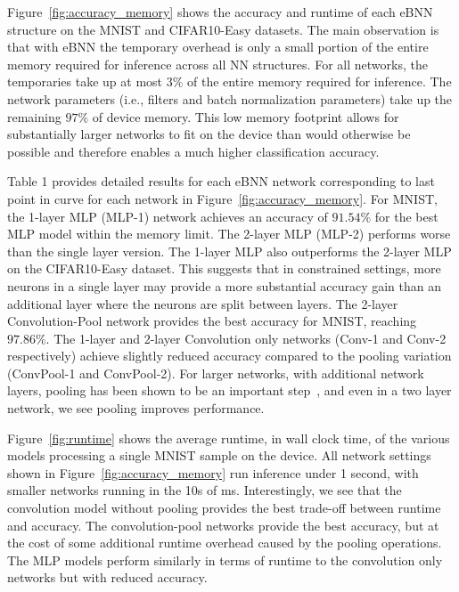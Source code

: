\documentclass[10pt,emptycopyrightspace]{ewsn-proc}
\begin{document}
Figure~\ref{fig:accuracy_memory} shows the accuracy and runtime of each eBNN structure on the MNIST and CIFAR10-Easy datasets. The main observation is that with eBNN the temporary overhead is only a small portion of the entire memory required for inference across all NN structures. For all networks, the temporaries take up at most $3\%$ of the entire memory required for inference. The network parameters (i.e., filters and batch normalization parameters) take up the remaining $97\%$ of device memory. This low memory footprint allows for substantially larger networks to fit on the device than would otherwise be possible and therefore enables a much higher classification accuracy.  %

Table 1 provides detailed results for each eBNN network corresponding to last point in curve for each network in Figure~\ref{fig:accuracy_memory}. For MNIST, the 1-layer MLP (MLP-1) network achieves an accuracy of $91.54\%$ for the best MLP model within the memory limit. The 2-layer MLP (MLP-2) performs worse than the single layer version. The 1-layer MLP also outperforms the 2-layer MLP on the CIFAR10-Easy dataset. This suggests that in constrained settings, more neurons in a single layer may provide a more substantial accuracy gain than an additional layer where the neurons are split between layers. The 2-layer Convolution-Pool network provides the best accuracy for MNIST, reaching $97.86\%$. The 1-layer and 2-layer Convolution only networks (Conv-1 and Conv-2 respectively) achieve slightly reduced accuracy compared to the pooling variation (ConvPool-1 and ConvPool-2). For larger networks, with additional network layers, pooling has been shown to be an important step~\cite{scherer2010evaluation}, and even in a two layer network, we see pooling improves performance. 


Figure~\ref{fig:runtime} shows the average runtime, in wall clock time, of the various models processing a single MNIST sample on the device. All network settings shown in Figure~\ref{fig:accuracy_memory} run inference under 1 second, with smaller networks running in the 10s of ms. Interestingly, we see that the convolution model without pooling provides the best trade-off between runtime and accuracy. The convolution-pool networks provide the best accuracy, but at the cost of some additional runtime overhead caused by the pooling operations. The MLP models perform similarly in terms of runtime to the convolution only networks but with reduced accuracy.
\end{document}
